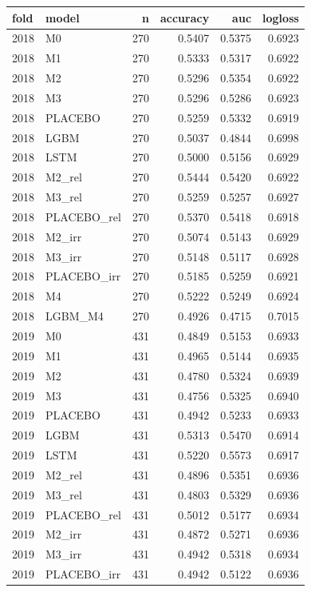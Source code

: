 \begin{tabular}{llrrrr}
\toprule
fold & model & n & accuracy & auc & logloss \\
\midrule
2018 & M0 & 270 & 0.5407 & 0.5375 & 0.6923 \\
2018 & M1 & 270 & 0.5333 & 0.5317 & 0.6922 \\
2018 & M2 & 270 & 0.5296 & 0.5354 & 0.6922 \\
2018 & M3 & 270 & 0.5296 & 0.5286 & 0.6923 \\
2018 & PLACEBO & 270 & 0.5259 & 0.5332 & 0.6919 \\
2018 & LGBM & 270 & 0.5037 & 0.4844 & 0.6998 \\
2018 & LSTM & 270 & 0.5000 & 0.5156 & 0.6929 \\
2018 & M2\_rel & 270 & 0.5444 & 0.5420 & 0.6922 \\
2018 & M3\_rel & 270 & 0.5259 & 0.5257 & 0.6927 \\
2018 & PLACEBO\_rel & 270 & 0.5370 & 0.5418 & 0.6918 \\
2018 & M2\_irr & 270 & 0.5074 & 0.5143 & 0.6929 \\
2018 & M3\_irr & 270 & 0.5148 & 0.5117 & 0.6928 \\
2018 & PLACEBO\_irr & 270 & 0.5185 & 0.5259 & 0.6921 \\
2018 & M4 & 270 & 0.5222 & 0.5249 & 0.6924 \\
2018 & LGBM\_M4 & 270 & 0.4926 & 0.4715 & 0.7015 \\
2019 & M0 & 431 & 0.4849 & 0.5153 & 0.6933 \\
2019 & M1 & 431 & 0.4965 & 0.5144 & 0.6935 \\
2019 & M2 & 431 & 0.4780 & 0.5324 & 0.6939 \\
2019 & M3 & 431 & 0.4756 & 0.5325 & 0.6940 \\
2019 & PLACEBO & 431 & 0.4942 & 0.5233 & 0.6933 \\
2019 & LGBM & 431 & 0.5313 & 0.5470 & 0.6914 \\
2019 & LSTM & 431 & 0.5220 & 0.5573 & 0.6917 \\
2019 & M2\_rel & 431 & 0.4896 & 0.5351 & 0.6936 \\
2019 & M3\_rel & 431 & 0.4803 & 0.5329 & 0.6936 \\
2019 & PLACEBO\_rel & 431 & 0.5012 & 0.5177 & 0.6934 \\
2019 & M2\_irr & 431 & 0.4872 & 0.5271 & 0.6936 \\
2019 & M3\_irr & 431 & 0.4942 & 0.5318 & 0.6934 \\
2019 & PLACEBO\_irr & 431 & 0.4942 & 0.5122 & 0.6936 \\

\end{tabular}
